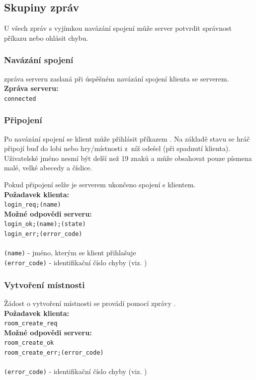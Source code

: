 \documentclass[12pt, a4paper]{article} %
\begin{document}
	\subsection{Skupiny zpráv}
	\par U všech zpráv s vyjímkou navázání spojení může server potvrdit správnost příkazu nebo ohlásit chybu.
	\subsubsection{Navázání spojení}
	\par {} zpráva serveru zaslaná při úspěšném navázání spojení klienta se serverem.\\
	\textbf{Zpráva serveru:}\\
	\texttt{connected}
	\subsubsection{Připojení}
	\par Po navázání spojení se klient může přihlásit příkazem . Na základě stavu se hráč připojí buď do lobi nebo hry/místnosti z níž odešel (při spadnutí klienta). Uživatelské jméno nesmí být delší než 19 znaků a může obsahovat pouze písmena malé, velké abecedy a číslice.
	\par Pokud připojení selže je serverem ukončeno spojení s klientem.\\
	\textbf{Požadavek klienta:}\\
	\texttt{login\_req;(name)}\\
	\textbf{Možné odpovědi serveru:}\\
	\texttt{login\_ok;(name);(state)}\\
	\texttt{login\_err;(error\_code)}\\\\
	\texttt{(name)} - jméno, kterým se klient přihlašuje\\
	\texttt{(error\_code)} - identifikační číslo chyby (viz. )
	\subsubsection{Vytvoření místnosti}
	\par Žádost o vytvoření místnosti se provádí pomocí zprávy .\\
	\textbf{Požadavek klienta:}\\
	\texttt{room\_create\_req}\\
	\textbf{Možné odpovědi serveru:}\\
	\texttt{room\_create\_ok}\\
	\texttt{room\_create\_err;(error\_code)}\\\\
	\texttt{(error\_code)} - identifikační číslo chyby (viz. )
\end{document}
